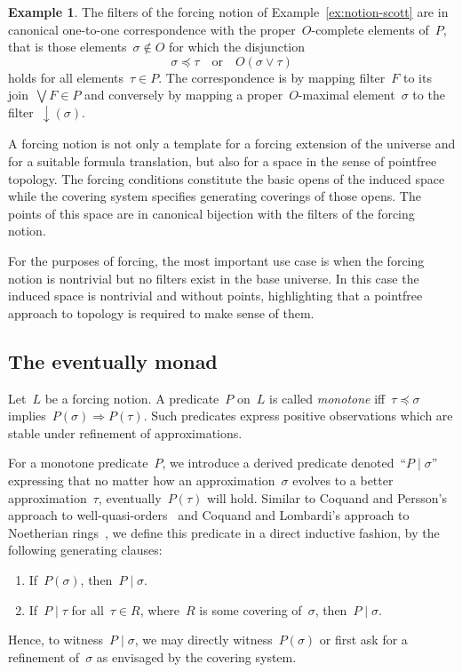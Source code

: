 \documentclass[com,11pt,crcready]{iosart2x}
\theoremstyle{definition}
\newtheorem{example}[definition]{Example}
\theoremstyle{plain}
\theoremstyle{remark}
\renewcommand{\_}{\mathpunct{.}\,}
\begin{document}
\begin{example}The filters of the forcing notion of
Example~\ref{ex:notion-scott} are in canonical one-to-one correspondence with
the proper~$O$-complete elements of~$P$, that is those elements~$\sigma \not\in O$ for
which the disjunction
\[ \sigma \preceq \tau \quad\text{or}\quad O(\sigma \vee \tau) \]
holds for all elements~$\tau \in P$. The correspondence is by mapping
filter~$F$ to its join~$\bigvee F \in P$ and conversely by mapping
a proper~$O$-maximal element~$\sigma$ to the filter~$\downarrow(\sigma)$.
\end{example}

A forcing notion is not only a template for a forcing extension of the universe and
for a suitable formula translation, but also for a space in the sense of
pointfree topology. The forcing conditions constitute the basic opens of the
induced space while the covering system specifies generating coverings of
those opens. The points of this space are in canonical bijection with the
filters of the forcing notion.

For the purposes of forcing, the most important use case is when the forcing
notion is nontrivial but no filters exist in the base universe. In this case
the induced space is nontrivial and without points, highlighting that a
pointfree approach to topology is required to make sense of them.


\subsection{The eventually monad} Let~$L$ be a forcing notion. A
predicate~$P$ on~$L$ is called \emph{monotone} iff~$\tau \preceq \sigma$
implies~$P(\sigma) \Rightarrow P(\tau)$. Such predicates express positive
observations which are stable under refinement of approximations.

For a monotone predicate~$P$, we introduce a derived predicate denoted~``$P
\mid \sigma$'' expressing that no matter how an approximation~$\sigma$ evolves
to a better approximation~$\tau$, eventually~$P(\tau)$ will hold. Similar to
Coquand and Persson's approach to well-quasi-orders~\cite[Definition~6]{coquand-persson:groebner} and
Coquand and Lombardi's approach to Noetherian
rings~\cite{coquand-lombardi:krull,coquand:invariant}, we define this predicate
in a direct inductive fashion, by the following generating clauses:
\begin{enumerate}
\item If~$P(\sigma)$, then~$P \mid \sigma$.
\item If~$P \mid \tau$ for all~$\tau \in R$, where~$R$ is some covering
of~$\sigma$, then~$P \mid \sigma$.
\end{enumerate}
Hence, to witness~$P \mid \sigma$, we may directly witness~$P(\sigma)$ or first
ask for a refinement of~$\sigma$ as envisaged by the covering system.
\end{document}
